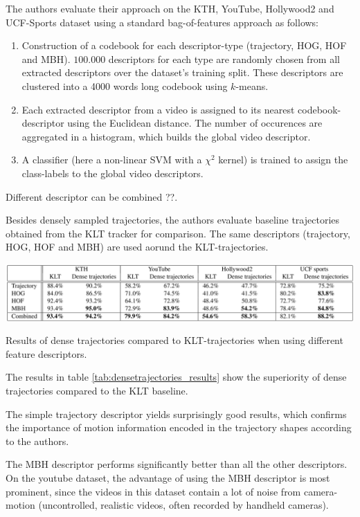 The authors evaluate their approach on the KTH, YouTube, Hollywood2 and UCF-Sports dataset using a standard bag-of-features approach as follows:

\begin{enumerate}
    \item Construction of a codebook for each descriptor-type (trajectory, HOG, HOF and MBH).
        $100.000$ descriptors for each type are randomly chosen from all extracted descriptors over the dataset's training split.
        These descriptors are clustered into a 4000 words long codebook using $k$-means.
    \item Each extracted descriptor from a video is assigned to its nearest codebook-descriptor using the Euclidean distance.
        The number of occurences are aggregated in a histogram, which builds the global video descriptor.
    \item A classifier (here a non-linear SVM with a $\chi^2$ kernel) is trained to assign the class-labels to the global video descriptors.
\end{enumerate}

Different descriptor can be combined ??.

Besides densely sampled trajectories, the authors evaluate baseline trajectories obtained from the KLT tracker for comparison.
The same descriptors (trajectory, HOG, HOF and MBH) are used aorund the KLT-trajectories.

\begin{table}[H]
    \centering
    \includegraphics[width=\textwidth]{img_conventional/densetrajectories_results}
    \caption{Results of dense trajectories compared to KLT-trajectories when using different feature descriptors. \cite{wang_action_2011}}
    \label{tab:densetrajectories_results}
\end{table}

The results in table \ref{tab:densetrajectories_results} show the superiority of dense trajectories compared to the KLT baseline.

The simple trajectory descriptor yields surprisingly good results, which confirms the importance of motion information encoded in the trajectory shapes according to the authors.

The MBH descriptor performs significantly better than all the other descriptors.
On the youtube dataset, the advantage of using the MBH descriptor is most prominent, since the videos in this dataset contain a lot of noise from camera-motion (uncontrolled, realistic videos, often recorded by handheld cameras).

